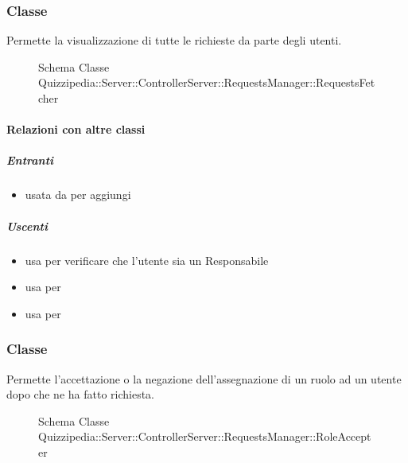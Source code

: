 \subsubsection{Classe }
Permette la visualizzazione di tutte le richieste da parte degli utenti.
\begin{figure}[H]
\centering
\noindent{}
\caption[Schema Classe RequestsFetcher]{Schema Classe Quizzipedia::Server::ControllerServer::RequestsManager::RequestsFetcher}
\end{figure}
\paragraph{Relazioni con altre classi}
\subparagraph{Entranti}
\begin{itemize}
\item usata da  per aggiungi
\end{itemize}
\subparagraph{Uscenti}
\begin{itemize}
\item usa  per verificare che l'utente sia un Responsabile
\item usa  per 
\item usa  per 
\end{itemize}
\subsubsection{Classe }
Permette l'accettazione o la negazione dell'assegnazione di un ruolo ad un utente dopo che ne ha fatto richiesta.
\begin{figure}[H]
\centering
\noindent{}
\caption[Schema Classe RoleAccepter]{Schema Classe Quizzipedia::Server::ControllerServer::RequestsManager::RoleAccepter}
\end{figure}
